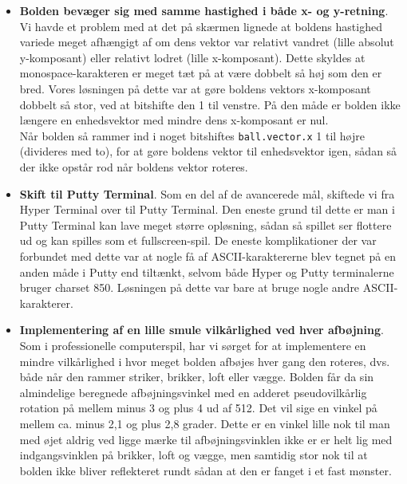 \begin{itemize}
\item \textbf{Bolden bevæger sig med samme hastighed i både x- og y-retning}. Vi havde et problem med at det på skærmen lignede at boldens hastighed variede meget afhængigt af om dens vektor var relativt vandret (lille absolut y-komposant) eller relativt lodret (lille x-komposant). Dette skyldes at monospace-karakteren er meget tæt på at være dobbelt så høj som den er bred. Vores løsningen på dette var at gøre boldens vektors x-komposant dobbelt så stor, ved at bitshifte den 1 til venstre. På den måde er bolden ikke længere en enhedsvektor med mindre dens x-komposant er nul.\\
Når bolden så rammer ind i noget bitshiftes \texttt{ball.vector.x} 1 til højre (divideres med to), for at gøre boldens vektor til enhedsvektor igen, sådan så der ikke opstår rod når boldens vektor roteres.

\item \textbf{Skift til Putty Terminal}. Som en del af de avancerede mål, skiftede vi fra Hyper Terminal over til Putty Terminal. Den eneste grund til dette er man i Putty Terminal kan lave meget større opløsning, sådan så spillet ser flottere ud og kan spilles som et fullscreen-spil. De eneste komplikationer der var forbundet med dette var at nogle få af ASCII-karaktererne blev tegnet på en anden måde i Putty end tiltænkt, selvom både Hyper og Putty terminalerne bruger charset 850. Løsningen på dette var bare at bruge nogle andre ASCII-karakterer.

\item \textbf{Implementering af en lille smule vilkårlighed ved hver afbøjning}. Som i professionelle computerspil, har vi sørget for at implementere en mindre vilkårlighed i hvor meget bolden afbøjes hver gang den roteres, dvs. både når den rammer striker, brikker, loft eller vægge. Bolden får da sin almindelige beregnede afbøjningsvinkel med en adderet pseudovilkårlig rotation på mellem minus 3 og plus 4 ud af 512. Det vil sige en vinkel på mellem ca. minus 2,1 og plus 2,8 grader. Dette er en vinkel lille nok til man med øjet aldrig ved ligge mærke til afbøjningsvinklen ikke er er helt lig med indgangsvinklen på brikker, loft og vægge, men samtidig stor nok til at bolden ikke bliver reflekteret rundt sådan at den er fanget i et fast mønster.


\end{itemize}
